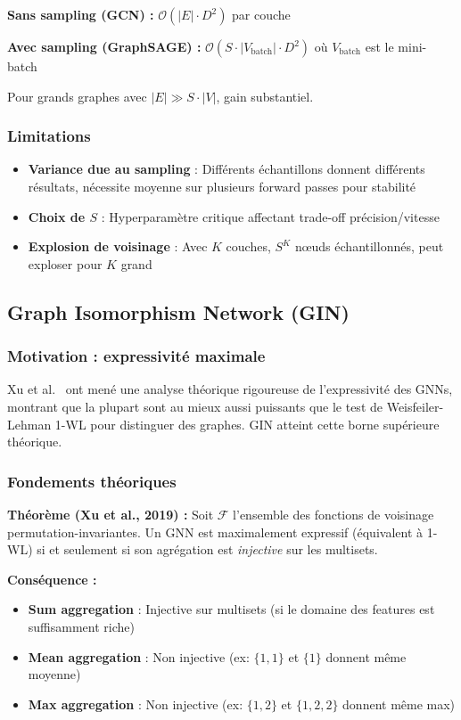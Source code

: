 \textbf{Sans sampling (GCN) :} $\mathcal{O}(|E| \cdot D^2)$ par couche

\textbf{Avec sampling (GraphSAGE) :} $\mathcal{O}(S \cdot |V_{\text{batch}}| \cdot D^2)$ où $V_{\text{batch}}$ est le mini-batch

Pour grands graphes avec $|E| \gg S \cdot |V|$, gain substantiel.

\subsubsection{Limitations}

\begin{itemize}
    \item \textbf{Variance due au sampling} : Différents échantillons donnent différents résultats, nécessite moyenne sur plusieurs forward passes pour stabilité
    \item \textbf{Choix de $S$} : Hyperparamètre critique affectant trade-off précision/vitesse
    \item \textbf{Explosion de voisinage} : Avec $K$ couches, $S^K$ nœuds échantillonnés, peut exploser pour $K$ grand
\end{itemize}

\subsection{Graph Isomorphism Network (GIN)}

\subsubsection{Motivation : expressivité maximale}

Xu et al.~\cite{Xu2019} ont mené une analyse théorique rigoureuse de l'expressivité des GNNs, montrant que la plupart sont au mieux aussi puissants que le test de Weisfeiler-Lehman 1-WL pour distinguer des graphes. GIN atteint cette borne supérieure théorique.

\subsubsection{Fondements théoriques}

\textbf{Théorème (Xu et al., 2019) :}
Soit $\mathcal{F}$ l'ensemble des fonctions de voisinage permutation-invariantes. Un GNN est maximalement expressif (équivalent à 1-WL) si et seulement si son agrégation est \textit{injective} sur les multisets.

\textbf{Conséquence :}
\begin{itemize}
    \item \textbf{Sum aggregation} : Injective sur multisets (si le domaine des features est suffisamment riche)
    \item \textbf{Mean aggregation} : Non injective (ex: $\{1,1\}$ et $\{1\}$ donnent même moyenne)
    \item \textbf{Max aggregation} : Non injective (ex: $\{1,2\}$ et $\{1,2,2\}$ donnent même max)
\end{itemize}

